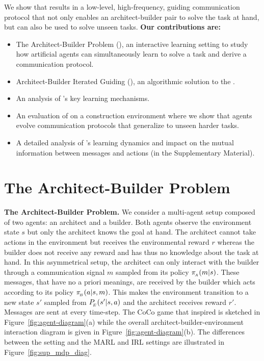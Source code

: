 We show that \abig results in a low-level, high-frequency, guiding communication protocol that not only enables an architect-builder pair to solve the task at hand, but can also be used to solve unseen tasks.
\textbf{Our contributions are:} 
\begin{itemize}[noitemsep]
    \item The %
    Architect-Builder Problem (\abp), an interactive learning setting to study how %
    artificial agents can simultaneously learn to solve a task and derive a communication protocol. 
    \item Architect-Builder Iterated Guiding (\abig), an algorithmic solution to the \abp. 
    \item An analysis of \abig's key learning mechanisms. 
    \item An evaluation of \abig on a construction environment where we show that \abig agents evolve communication protocols that generalize to unseen harder tasks.
    \item A detailed analysis of \abig's learning dynamics and impact on the mutual information between messages and actions (in the Supplementary Material). 
\end{itemize}


\section{The Architect-Builder Problem}

\label{sec:prob_def_abp}
\textbf{The Architect-Builder Problem. } We consider a multi-agent setup composed of two agents: an architect and a builder. Both agents observe the environment state $s$ but only the architect knows the goal at hand. The architect cannot take actions in the environment but receives the environmental reward $r$ whereas the builder does not receive any reward and has thus no knowledge about the task at hand. In this asymmetrical setup, the architect can only interact with the builder through a communication signal $m$ sampled from its policy $\pi_{\!_A}(m|s)$. These messages, that have no a priori meanings, are received by the builder which acts according to its policy $\pi_{\!_B}(a|s,m)$. This makes the environment transition to a new state $s'$ sampled from $P_{\!_E}(s'|s,a)$ and the architect receives reward $r'$. Messages are sent at every time-step. The CoCo game that inspired \abp is sketched in Figure~\ref{fig:agent-diagram}(a) while the overall architect-builder-environment interaction diagram is given in Figure~\ref{fig:agent-diagram}(b). The differences between the \abp setting and the MARL and IRL settings are illustrated in Figure~\ref{fig:sup_mdp_diag}.

